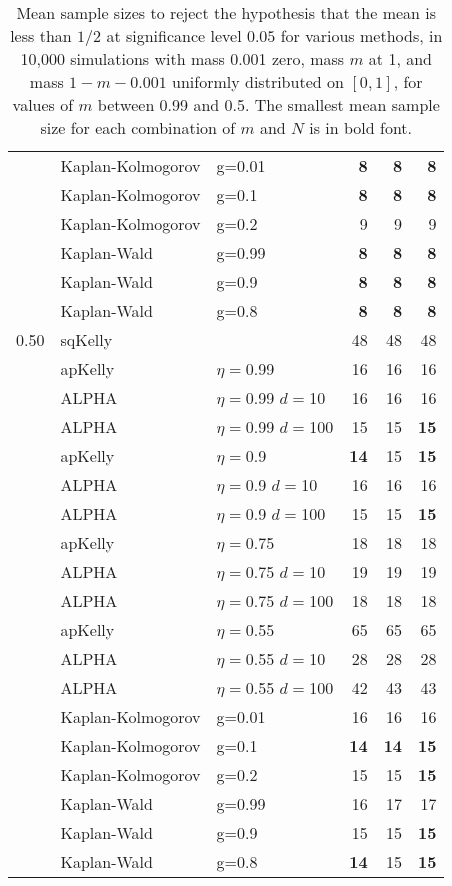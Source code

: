\documentclass[12pt,runningheads]{llncs}
\begin{document}
{\begin{table}
\begin{tabular}{lll|rrr}
\cline{2-6}
 & Kaplan-Kolmogorov & g=0.01 & \bf{8}  & \bf{8}  & \bf{8}  \\
 & Kaplan-Kolmogorov & g=0.1 & \bf{8}  & \bf{8}  & \bf{8}  \\
 & Kaplan-Kolmogorov & g=0.2 & 9  & 9  & 9  \\
\cline{2-6}
 & Kaplan-Wald & g=0.99 & \bf{8}  & \bf{8}  & \bf{8}  \\
 & Kaplan-Wald & g=0.9 & \bf{8}  & \bf{8}  & \bf{8}  \\
 & Kaplan-Wald & g=0.8 & \bf{8}  & \bf{8}  & \bf{8}  \\
\hline 0.50 & sqKelly & & 48  & 48  & 48  \\
\cline{2-6} & apKelly & $\eta=$0.99 & 16  & 16  & 16  \\
\cline{2-6}
& ALPHA & $\eta=$0.99 $d=$10 & 16  & 16  & 16  \\
& ALPHA & $\eta=$0.99 $d=$100 & 15  & 15  & \bf{15}  \\
\cline{2-6} & apKelly & $\eta=$0.9 & \bf{14}  & 15  & \bf{15}  \\
\cline{2-6}
& ALPHA & $\eta=$0.9 $d=$10 & 16  & 16  & 16  \\
& ALPHA & $\eta=$0.9 $d=$100 & 15  & 15  & \bf{15}  \\
\cline{2-6} & apKelly & $\eta=$0.75 & 18  & 18  & 18  \\
\cline{2-6}
& ALPHA & $\eta=$0.75 $d=$10 & 19  & 19  & 19  \\
& ALPHA & $\eta=$0.75 $d=$100 & 18  & 18  & 18  \\
\cline{2-6} & apKelly & $\eta=$0.55 & 65  & 65  & 65  \\
\cline{2-6}
& ALPHA & $\eta=$0.55 $d=$10 & 28  & 28  & 28  \\
& ALPHA & $\eta=$0.55 $d=$100 & 42  & 43  & 43  \\
\cline{2-6}
 & Kaplan-Kolmogorov & g=0.01 & 16  & 16  & 16  \\
 & Kaplan-Kolmogorov & g=0.1 & \bf{14}  & \bf{14}  & \bf{15}  \\
 & Kaplan-Kolmogorov & g=0.2 & 15  & 15  & \bf{15}  \\
\cline{2-6}
 & Kaplan-Wald & g=0.99 & 16  & 17  & 17  \\
 & Kaplan-Wald & g=0.9 & 15  & 15  & \bf{15}  \\
 & Kaplan-Wald & g=0.8 & \bf{14}  & 15  & \bf{15}  
\end{tabular} 

\caption{\protect \label{tab:comparison-1} Mean sample sizes to reject the hypothesis that the mean is less than $1/2$ at significance level $0.05$ for various methods, in 10,000  simulations with mass 0.001 zero, mass $m$ at 1, and mass $1-m-0.001$ uniformly  distributed on $[0, 1]$, for values of $m$ between 0.99 and 0.5. 
The smallest mean sample size for each combination of $m$ and $N$ is in bold font.
}
\end{table}
 
}
\end{document}
